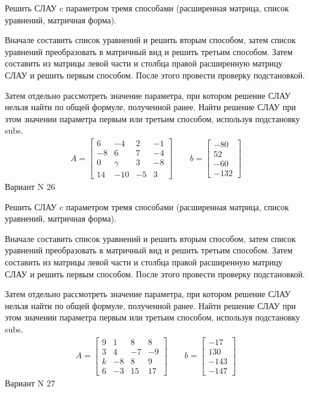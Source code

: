 \documentclass[11pt]{report}
\begin{document}
Решить СЛАУ c параметром тремя способами (расширенная матрица, список уравнений, матричная форма).

Вначале составить список уравнений и решить вторым способом,
затем список уравнений преобразовать в матричный вид и решить третьим способом.
Затем составить из матрицы левой части и столбца правой расширенную матрицу СЛАУ и решить первым способом.
После этого провести проверку подстановкой.

Затем отдельно рассмотреть значение параметра, при котором решение СЛАУ нельзя найти по общей формуле,
полученной ранее.
Найти решение СЛАУ при этом значении параметра первым или третьим способом, используя подстановку subs.
\begin{align*}
    A = \left[\begin{matrix}6 & -4 & 2 & -1\\-8 & 6 & 7 & -4\\0 & \gamma & 3 & -8\\14 & -10 & -5 & 3\end{matrix}\right]
\qquad b = \left[\begin{matrix}-80\\52\\-60\\-132\end{matrix}\right]
\end{align*}
\newpage
Вариант N 26


Решить СЛАУ c параметром тремя способами (расширенная матрица, список уравнений, матричная форма).

Вначале составить список уравнений и решить вторым способом,
затем список уравнений преобразовать в матричный вид и решить третьим способом.
Затем составить из матрицы левой части и столбца правой расширенную матрицу СЛАУ и решить первым способом.
После этого провести проверку подстановкой.

Затем отдельно рассмотреть значение параметра, при котором решение СЛАУ нельзя найти по общей формуле,
полученной ранее.
Найти решение СЛАУ при этом значении параметра первым или третьим способом, используя подстановку subs.
\begin{align*}
    A = \left[\begin{matrix}9 & 1 & 8 & 8\\3 & 4 & -7 & -9\\k & -8 & 8 & 9\\6 & -3 & 15 & 17\end{matrix}\right]
\qquad b = \left[\begin{matrix}-17\\130\\-143\\-147\end{matrix}\right]
\end{align*}
\newpage
Вариант N 27
\end{document}
